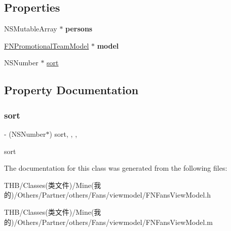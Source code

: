 \subsection*{Properties}
\begin{DoxyCompactItemize}
\item 
\mbox{\label{interface_f_n_fans_view_model_ad64f202f13c5b20f47c972c1d7d9910c}} 
N\+S\+Mutable\+Array $\ast$ {\bfseries persons}
\item 
\mbox{\label{interface_f_n_fans_view_model_a6c9d1aebee6f08e6fa50b52547c5392b}} 
\mbox{\hyperlink{interface_f_n_promotional_team_model}{F\+N\+Promotional\+Team\+Model}} $\ast$ {\bfseries model}
\item 
N\+S\+Number $\ast$ \mbox{\hyperlink{interface_f_n_fans_view_model_a2ef19bf02e017f5592125d96cf50eb16}{sort}}
\end{DoxyCompactItemize}


\subsection{Property Documentation}
\mbox{\label{interface_f_n_fans_view_model_a2ef19bf02e017f5592125d96cf50eb16}} 
\subsubsection{\texorpdfstring{sort}{sort}}
{\footnotesize\ttfamily -\/ (N\+S\+Number$\ast$) sort\hspace{0.3cm}{\ttfamily [read]}, {\ttfamily [write]}, {\ttfamily [nonatomic]}, {\ttfamily [strong]}}

sort 

The documentation for this class was generated from the following files\+:\begin{DoxyCompactItemize}
\item 
T\+H\+B/\+Classes(类文件)/\+Mine(我的)/\+Others/\+Partner/others/\+Fans/viewmodel/F\+N\+Fans\+View\+Model.\+h\item 
T\+H\+B/\+Classes(类文件)/\+Mine(我的)/\+Others/\+Partner/others/\+Fans/viewmodel/F\+N\+Fans\+View\+Model.\+m\end{DoxyCompactItemize}
